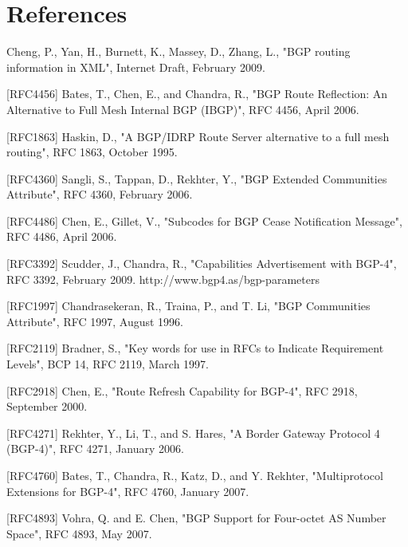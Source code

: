 \documentclass{article}
\begin{document}
\section{References}


				Cheng, P., Yan, H., Burnett, K., Massey, D., Zhang, L., "BGP routing
				information in XML", Internet Draft, February 2009.

	[RFC4456]	Bates, T., Chen, E., and Chandra, R., "BGP Route Reflection: 
				An Alternative to Full Mesh Internal BGP (IBGP)", RFC 4456, April 2006.

	[RFC1863]	Haskin, D., "A BGP/IDRP Route Server alternative to a full mesh routing",
				RFC 1863, October 1995.

	[RFC4360]	Sangli, S., Tappan, D., Rekhter, Y., "BGP Extended Communities Attribute",
				RFC 4360, February 2006.

	[RFC4486]	Chen, E., Gillet, V., "Subcodes for BGP Cease Notification Message",
				RFC 4486, April 2006.

	[RFC3392]	Scudder, J., Chandra, R., "Capabilities Advertisement with BGP-4",
				RFC 3392, February 2009.
http://www.bgp4.as/bgp-parameters

   [RFC1997]  Chandrasekeran, R., Traina, P., and T. Li, "BGP
              Communities Attribute", RFC 1997, August 1996.

   [RFC2119]  Bradner, S., "Key words for use in RFCs to Indicate
              Requirement Levels", BCP 14, RFC 2119, March 1997.

   [RFC2918]  Chen, E., "Route Refresh Capability for BGP-4", RFC 2918,
              September 2000.

   [RFC4271]  Rekhter, Y., Li, T., and S. Hares, "A Border Gateway
              Protocol 4 (BGP-4)", RFC 4271, January 2006.

   [RFC4760]  Bates, T., Chandra, R., Katz, D., and Y. Rekhter,
              "Multiprotocol Extensions for BGP-4", RFC 4760,
              January 2007.

   [RFC4893]  Vohra, Q. and E. Chen, "BGP Support for Four-octet AS
              Number Space", RFC 4893, May 2007.
\end{document}
